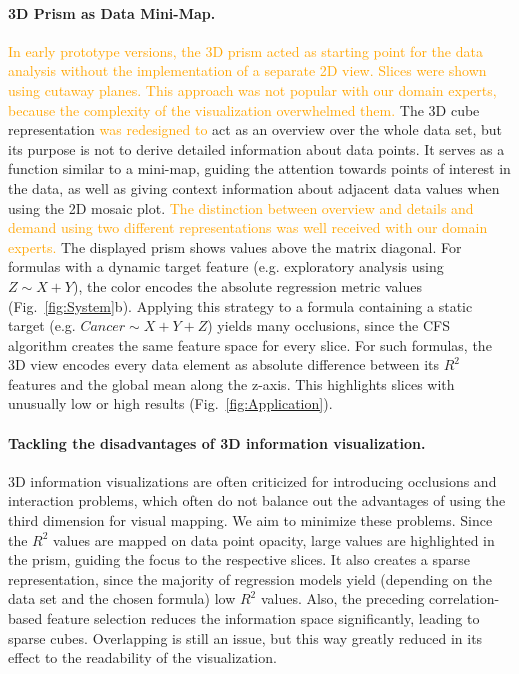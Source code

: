 \documentclass[journal]{style/vgtc} 			          %
\newcommand{\design}[1]{\textcolor{orange}{#1}}
\begin{document}
\paragraph{3D Prism as Data Mini-Map.}
\design{
In early prototype versions, the 3D prism acted as starting point for the data analysis without the implementation of a separate 2D view.
Slices were shown using cutaway planes.
This approach was not popular with our domain experts, because the complexity of the visualization overwhelmed them. %
}
The 3D cube representation \design{was redesigned to} act as an overview over the whole data set, but its purpose is not to derive detailed information about data points.
It serves as a function similar to a mini-map, guiding the attention towards points of interest in the data, as well as giving context information about adjacent data values when using the 2D mosaic plot.
\design{The distinction between overview and details and demand using two different representations was well received with our domain experts.}
The displayed prism shows values above the matrix diagonal.
For formulas with a dynamic target feature (e.g. exploratory analysis using $Z \sim X + Y$), the color encodes the absolute regression metric values (Fig.~\ref{fig:System}b).
Applying this strategy to a formula containing a static target (e.g. $Cancer \sim X + Y + Z$) yields many occlusions, since the CFS algorithm creates the same feature space for every slice.
For such formulas, the 3D view encodes every data element as absolute difference between its $R^2$ features and the global mean along the z-axis.
This highlights slices with unusually low or high results (Fig.~\ref{fig:Application}).
\paragraph{Tackling the disadvantages of 3D information visualization.}
3D information visualizations are often criticized for introducing occlusions and interaction problems, which often do not balance out the advantages of using the third dimension for visual mapping.
We aim to minimize these problems.
Since the $R^2$ values are mapped on data point opacity, large values are highlighted in the prism, guiding the focus to the respective slices.
It also creates a sparse representation, since the majority of regression models yield (depending on the data set and the chosen formula) low $R^2$ values.
Also, the preceding correlation-based feature selection reduces the information space significantly, leading to sparse cubes.
Overlapping is still an issue, but this way greatly reduced in its effect to the readability of the visualization.
\end{document}
